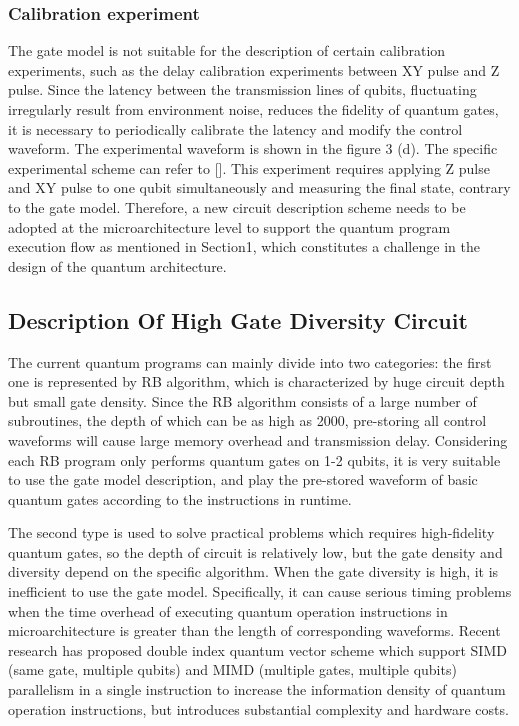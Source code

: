 \subsubsection{Calibration experiment}
The gate model is not suitable for the description of certain calibration experiments, 
such as the delay calibration experiments between XY pulse and Z pulse. 
Since the latency between the transmission lines of qubits, fluctuating irregularly result from environment noise, 
reduces the fidelity of quantum gates, it is necessary to periodically calibrate the latency and modify the control waveform. 
The experimental waveform is shown in the figure 3 (d). 
The specific experimental scheme can refer to []. 
This experiment requires applying Z pulse and XY pulse to one qubit simultaneously and measuring the final state, contrary to the gate model. 
Therefore, a new circuit description scheme needs to be adopted at the microarchitecture level to support the quantum program execution flow as mentioned in Section1, 
which constitutes a challenge in the design of the quantum architecture.


\subsection{Description Of High Gate Diversity Circuit}
The current quantum programs can mainly divide into two categories: 
the first one is represented by RB algorithm, 
which is characterized by huge circuit depth but small gate density. 
Since the RB algorithm consists of a large number of subroutines, 
the depth of which can be as high as 2000, 
pre-storing all control waveforms will cause large memory overhead and transmission delay. 
Considering each RB program only performs quantum gates on 1-2 qubits, 
it is very suitable to use the gate model description, 
and play the pre-stored waveform of basic quantum gates according to the instructions in runtime.

The second type is used to solve practical problems which requires high-fidelity quantum gates, 
so the depth of circuit is relatively low, 
but the gate density and diversity depend on the specific algorithm.
When the gate diversity is high, it is inefficient to use the gate model. 
Specifically, it can cause serious timing problems when the time overhead of executing quantum 
operation instructions in microarchitecture is greater than the length of corresponding waveforms. 
Recent research has proposed double index quantum vector scheme which support SIMD (same gate, multiple qubits) 
and MIMD (multiple gates, multiple qubits) parallelism in a single instruction to increase the information density of quantum 
operation instructions, but introduces substantial complexity and hardware costs.

